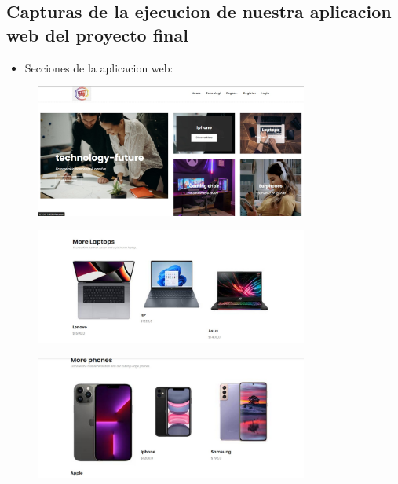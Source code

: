 \subsection{Capturas de la ejecucion de nuestra aplicacion web del proyecto final}
\begin{itemize}	
	\item Secciones de la aplicacion web:
\end{itemize}	
\begin{figure}[H]
	\centering
	\includegraphics[width=0.8\textwidth,keepaspectratio]{img/imagen1.jpg}
\end{figure}
\begin{figure}[H]
	\centering
	\includegraphics[width=0.8\textwidth,keepaspectratio]{img/imagen2.jpg}
\end{figure}
\begin{figure}[H]
	\centering
	\includegraphics[width=0.8\textwidth,keepaspectratio]{img/imagen3.jpg}
\end{figure}
